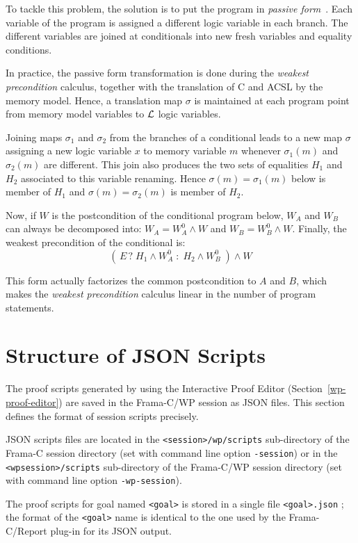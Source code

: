 To tackle this problem, the solution is to put the program in
\emph{passive form}~\cite{FlanaganSaxe2001,Leino2003}. Each variable
of the program is assigned a different logic variable in each
branch. The different variables are joined at conditionals into new
fresh variables and equality conditions.

In practice, the passive form transformation is done during the
\emph{weakest precondition} calculus, together with the translation of
\textsf{C} and \textsf{ACSL} by the memory model. Hence, a translation
map $\sigma$ is maintained at each program point from memory model
variables to $\cal{L}$ logic variables.

Joining maps $\sigma_1$ and $\sigma_2$ from the branches of a
conditional leads to a new map $\sigma$ assigning a new logic variable
$x$ to memory variable $m$ whenever $\sigma_1(m)$ and $\sigma_2(m)$
are different. This join also produces the two sets of equalities $H_1$
and $H_2$ associated to this variable renaming. Hence $\sigma(m)=\sigma_1(m)$ below
is member of $H_1$ and $\sigma(m)=\sigma_2(m)$ is member of $H_2$.

Now, if $W$ is the postcondition of the conditional program below,
$W_A$ and $W_B$ can always be decomposed into: $W_A=W^0_A\wedge W$ and
$W_B=W^0_B\wedge W$. Finally, the weakest precondition of the
conditional is:
\[ (\,E \, ?\; H_1\wedge W^0_A \;:\; H_2\wedge W^0_B\;) \wedge W \]

This form actually factorizes the common postcondition to $A$ and $B$,
which makes the \emph{weakest precondition} calculus linear in the
number of program statements.

\section{Structure of JSON Scripts}

The proof scripts generated by using the Interactive Proof Editor (Section~\ref{wp-proof-editor})
are saved in the \textsf{Frama-C/WP} session as \textsf{JSON} files. This section defines
the format of session scripts precisely.

\textsf{JSON} scripts files are located in the \texttt{<session>/wp/scripts} sub-directory
of the \textsf{Frama-C} session directory (set with command line option \texttt{-session})
or in the \texttt{<wpsession>/scripts} sub-directory of the \textsf{Frama-C/WP} session
directory (set with command line option \texttt{-wp-session}).

The proof scripts for goal named \texttt{<goal>} is stored in a single file \texttt{<goal>.json} ; the
format of the \texttt{<goal>} name is identical to the one used by the \textsf{Frama-C/Report} plug-in
for its \textsf{JSON} output.

